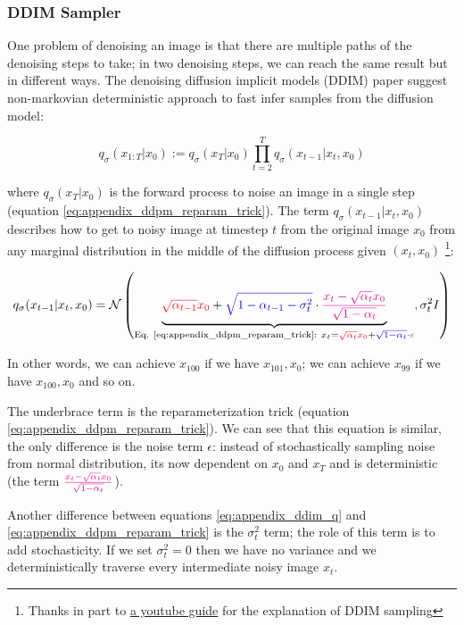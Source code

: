 \subsubsection{DDIM Sampler}

One problem of denoising an image is that there are multiple paths of the denoising steps to take; in two denoising steps, we can reach the same result but in different ways. The denoising diffusion implicit models (DDIM) paper \cite{ddim} suggest non-markovian deterministic approach to fast infer samples from the diffusion model:

\[ q_\sigma (x_{1:T} | x_0) := q_\sigma (x_T | x_0) \prod_{t=2}^{T} q_\sigma (x_{t-1} | x_t, x_0)\]

where $q_\sigma (x_T | x_0)$ is the forward process to noise an image in a single step (equation \ref{eq:appendix_ddpm_reparam_trick}). The term $q_\sigma (x_{t-1} | x_t, x_0)$ describes how to get to noisy image at timestep $t$ from the original image $x_0$ from any marginal distribution in the middle of the diffusion process given $(x_t, x_0)$ \footnote{Thanks in part to \href{https://www.youtube.com/watch?v=r4V0vLhYZIQ&t=686s}{a youtube guide} for the explanation of DDIM sampling}:

\begin{equation}
q_\sigma (x_{t-1} | x_t, x_0) = \mathcal{N} \left( 
\underbrace{
    \textcolor{red}{\sqrt{\alpha_{t-1}} x_0} + \textcolor{blue}{\sqrt{1 - \alpha_{t-1} - \sigma_t^2}} \cdot \textcolor{magenta}{\frac{x_t - \sqrt{\alpha_t} x_0}{\sqrt{1 - \alpha_t}}}
}_{
    \text{Eq. \ref{eq:appendix_ddpm_reparam_trick}:}\ x_t = \textcolor{red}{\sqrt{\alpha_t} x_0} + \textcolor{blue}{\sqrt{1 - \alpha_t}} \cdot \textcolor{magenta}{\epsilon}
}, \sigma_t^2 I 
\right)
\label{eq:appendix_ddim_q}
\end{equation}

In other words, we can achieve $x_100$ if we have $x_101, x_0$; we can achieve $x_99$ if we have $x_100, x_0$ and so on.

The underbrace term is the reparameterization trick (equation \ref{eq:appendix_ddpm_reparam_trick}). We can see that this equation is similar, the only difference is the noise term $\epsilon$: instead of stochastically sampling noise from normal distribution, its now dependent on $x_0$ and $x_T$ and is deterministic (the term $\textcolor{magenta}{\frac{x_t - \sqrt{\alpha_t} x_0}{\sqrt{1 - \alpha_t}}}$).

Another difference between equations \ref{eq:appendix_ddim_q} and \ref{eq:appendix_ddpm_reparam_trick} is the $\sigma_t^2$ term; the role of this term is to add stochasticity. If we set $\sigma_t^2 = 0$ then we have no variance and we deterministically traverse every intermediate noisy image $x_t$.

